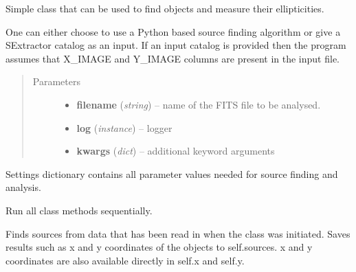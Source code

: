 \documentclass[a4paper,11pt,english]{sphinxmanual}
\begin{document}
\begin{fulllineitems}
\label{analysis:analysis.analyse.analyseVISdata}
Simple class that can be used to find objects and measure their ellipticities.

One can either choose to use a Python based source finding algorithm or
give a SExtractor catalog as an input. If an input catalog is provided
then the program assumes that X\_IMAGE and Y\_IMAGE columns are present
in the input file.
\begin{quote}\begin{description}
\item[{Parameters}] \leavevmode\begin{itemize}
\item {} 
\textbf{filename} (\emph{string}) -- name of the FITS file to be analysed.

\item {} 
\textbf{log} (\emph{instance}) -- logger

\item {} 
\textbf{kwargs} (\emph{dict}) -- additional keyword arguments

\end{itemize}

\end{description}\end{quote}

Settings dictionary contains all parameter values needed
for source finding and analysis.

\begin{fulllineitems}
\label{analysis:analysis.analyse.analyseVISdata.doAll}
Run all class methods sequentially.

\end{fulllineitems}


\begin{fulllineitems}
\label{analysis:analysis.analyse.analyseVISdata.findSources}
Finds sources from data that has been read in when the class was initiated.
Saves results such as x and y coordinates of the objects to self.sources.
x and y coordinates are also available directly in self.x and self.y.


\end{fulllineitems}
\end{fulllineitems}
\end{document}
